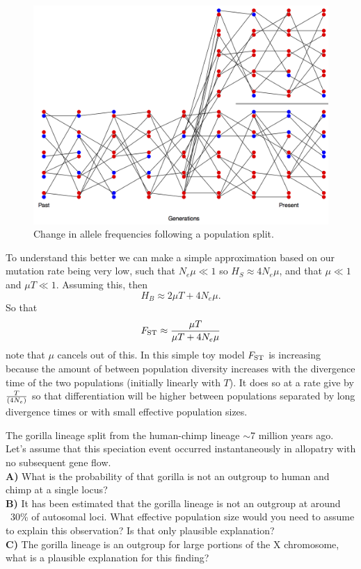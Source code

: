 \begin{figure}
\begin{center}
\includegraphics[width= 0.8 \textwidth]{figures/drift_split.png}
\end{center}
\caption{Change in allele frequencies following a population split.} \label{fig:drift_split}  
\end{figure} 

To understand this better we can make a simple
approximation based on our mutation rate being very low, such that
$N_e \mu \ll 1$ so $H_S \approx
4N_e\mu$, and that $\mu \ll 1$ and $\mu T \ll 1$. Assuming this, then  
\begin{equation}
H_B \approx 2 \mu T + 4N_e\mu. 
\end{equation}
So that 
\begin{equation}
\fst \approx \frac{ \mu T}{\mu T +  4N_e\mu }  %
\end{equation}
note that $\mu$ cancels out of this. In this simple toy model $\fst$
is increasing because the amount of between population diversity 
increases with the divergence time of the two populations (initially
linearly with $T$). It does so at a rate
give by $\nicefrac{T}{(4N_e)}$ so that differentiation will be higher
between populations separated by long divergence times or with small
effective population sizes.

\begin{question}
The gorilla lineage split from the human-chimp lineage $\sim$7 million years ago. Let’s assume that this speciation event occurred instantaneously in allopatry with no subsequent gene flow. \\
{\bf A)}	What is the probability of that gorilla is not an outgroup to human and chimp at a single locus?\\
{\bf B)}	It has been estimated that the gorilla lineage is not an outgroup at around ~30\% of autosomal loci. What effective population size would you need to assume to explain this observation? Is that only plausible explanation?\\
{\bf C)}	The gorilla lineage is an outgroup for large portions of the X chromosome, what is a plausible explanation for this finding?
\end{question}

